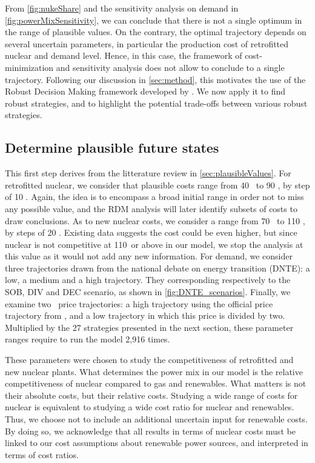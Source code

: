From \cref{fig:nukeShare} and the sensitivity analysis on demand in \cref{fig:powerMixSensitivity}, we can conclude that there is not a single optimum in the range of plausible values. On the contrary, the optimal trajectory depends on several uncertain parameters, in particular the production cost of retrofitted nuclear and demand level. Hence, in this case, the framework of cost-minimization and sensitivity analysis does not allow to conclude to a single trajectory. Following our discussion in \cref{sec:method}, this motivates the use of the Robust Decision Making framework developed by \citet{Lempert2006}. We now apply it to find robust strategies, and to highlight the potential trade-offs between various robust strategies.

\subsection{Determine plausible future states}

This first step derives from the litterature review in \cref{sec:plausibleValues}. 
For retrofitted nuclear, we consider that plausible costs range from 40 \emwh\ to 90 \emwh, by step of 10 \emwh. Again, the idea is to encompass a broad initial range in order not to miss any possible value, and the RDM analysis will later identify subsets of costs to draw conclusions. 
As to new nuclear costs, we consider a range from 70 \emwh\ to 110 \emwh, by steps of 20 \emwh. Existing data suggests the cost could be even higher, but since nuclear is not competitive at 110\emwh\ or above in our model, we stop the analysis at this value as it would not add any new information.
For demand, we consider three trajectories drawn from the national debate on energy transition (DNTE): a low, a medium and a high trajectory. They corresponding respectively to the SOB, DIV and DEC scenario, as shown in \cref{fig:DNTE_scenarios}.
Finally, we examine two \coo\ price trajectories: a high trajectory using the official price trajectory from \citet{Quinet2009}, and a low trajectory in which this price is divided by two.
Multiplied by the 27 strategies presented in the next section, these parameter ranges require to run the model 2,916 times. 

These parameters were chosen to study the competitiveness of retrofitted and new nuclear plants. What determines the power mix in our model is the relative competitiveness of nuclear compared to gas and renewables. What matters is not their absolute costs, but their relative costs.
Studying a wide range of costs for nuclear is equivalent to studying a wide cost ratio for nuclear and renewables.
Thus, we choose not to include an additional uncertain input for renewable costs. By doing so, we acknowledge that all results in terms of nuclear costs must be linked to our cost assumptions about renewable power sources, and interpreted in terms of cost ratios.


